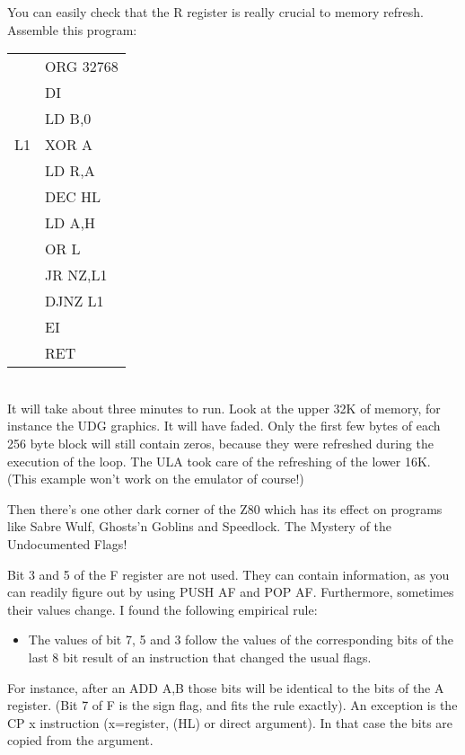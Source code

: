     You can easily check that the R register is really crucial to memory
    refresh.  Assemble this program:\\

\begin{tabular}{ll}
     & ORG 32768	\\
     & DI		\\
     & LD B,0		\\
  L1 & XOR A		\\
     & LD R,A		\\
     & DEC HL		\\
     & LD A,H		\\
     & OR L		\\
     & JR NZ,L1		\\
     & DJNZ L1		\\
     & EI		\\
     & RET		\\
\end{tabular}\\

\noindent
    It will take about three minutes to run.  Look at the upper 32K of
    memory, for instance the UDG graphics.  It will have faded.  Only the
    first few bytes of each 256 byte block will still contain zeros, because
    they were refreshed during the execution of the loop.  The ULA took care
    of the refreshing of the lower 16K.  (This example won't work on the
    emulator of course!)

    Then there's one other dark corner of the Z80 which has its effect on
    programs like Sabre Wulf, Ghosts'n Goblins and Speedlock.  The Mystery
    of the Undocumented Flags!

    Bit 3 and 5 of the F register are not used.  They can contain
    information, as you can readily figure out by using PUSH AF and POP AF\@.
    Furthermore, sometimes their values change.  I found the following
    empirical rule:\\

\newpage
\begin{itemize}
  \item[] The values of bit 7, 5 and 3 follow the values of the
          corresponding bits of the last 8 bit result of an instruction
          that changed the usual flags.
\end{itemize}


\noindent
    For instance, after an ADD A,B those bits will be identical to the bits
    of the A register.  (Bit 7 of F is the sign flag, and fits the rule
    exactly).  An exception is the CP x instruction (x=register, (HL) or
    direct argument).  In that case the bits are copied from the argument.

